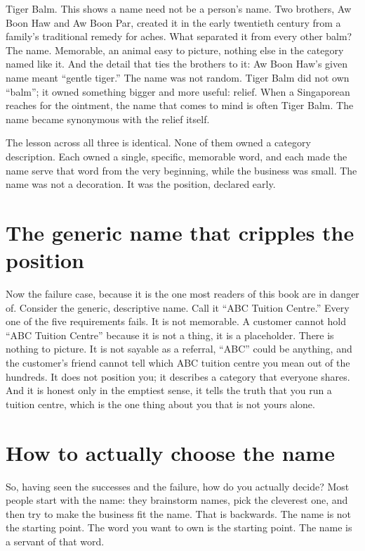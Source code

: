 \documentclass[10pt,twoside,openany]{memoir}
\newcommand{\needspacehead}{\needspace{4\baselineskip}}
\let\oldsection\section
\renewcommand{\section}{\needspacehead\oldsection}
\begin{document}
{Tiger Balm. This shows a name need not be a person's name. Two brothers,
Aw Boon Haw and Aw Boon Par, created it in the early twentieth century
from a family's traditional remedy for aches. What separated it from
every other balm? The name. Memorable, an animal easy to picture,
nothing else in the category named like it. And the detail that ties the
brothers to it: Aw Boon Haw's given name meant ``gentle tiger.'' The
name was not random. Tiger Balm did not own ``balm''; it owned something
bigger and more useful: relief. When a Singaporean reaches for the
ointment, the name that comes to mind is often Tiger Balm. The name
became synonymous with the relief itself.

The lesson across all three is identical. None of them owned a category
description. Each owned a single, specific, memorable word, and each
made the name serve that word from the very beginning, while the
business was small. The name was not a decoration. It was the position,
declared early.

\section{The generic name that cripples the
position}\label{the-generic-name-that-cripples-the-position}

Now the failure case, because it is the one most readers of this book
are in danger of. Consider the generic, descriptive name. Call it ``ABC
Tuition Centre.'' Every one of the five requirements fails. It is not
memorable. A customer cannot hold ``ABC Tuition Centre'' because it is
not a thing, it is a placeholder. There is nothing to picture. It is not
sayable as a referral, ``ABC'' could be anything, and the customer's
friend cannot tell which ABC tuition centre you mean out of the
hundreds. It does not position you; it describes a category that
everyone shares. And it is honest only in the emptiest sense, it tells
the truth that you run a tuition centre, which is the one thing about
you that is not yours alone.

\section{How to actually choose the
name}\label{how-to-actually-choose-the-name}

So, having seen the successes and the failure, how do you actually
decide? Most people start with the name: they brainstorm names, pick the
cleverest one, and then try to make the business fit the name. That is
backwards. The name is not the starting point. The word you want to own
is the starting point. The name is a servant of that word.

}
\end{document}
